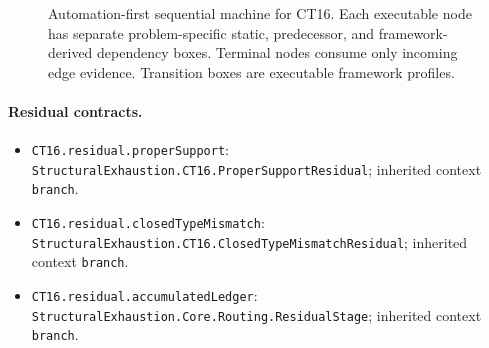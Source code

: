 \begin{landscape}
\begin{figure}[p]
\begin{adjustbox}{max totalsize={\linewidth}{0.72\textheight},center}
%
\end{adjustbox}
\caption{Automation-first sequential machine for CT16. Each executable node has separate problem-specific static, predecessor, and framework-derived dependency boxes. Terminal nodes consume only incoming edge evidence. Transition boxes are executable framework profiles.}
\label{fig:ct16-machine}
\end{figure}
\end{landscape}

\begingroup\small\sloppy
\paragraph{Residual contracts.}
\begin{itemize}
\item \texttt{CT16.\allowbreak{}residual.\allowbreak{}proper\allowbreak{}Support}: \texttt{Structural\allowbreak{}Exhaustion.\allowbreak{}CT16.\allowbreak{}Proper\allowbreak{}Support\allowbreak{}Residual}; inherited context \texttt{branch}.
\item \texttt{CT16.\allowbreak{}residual.\allowbreak{}closed\allowbreak{}Type\allowbreak{}Mismatch}: \texttt{Structural\allowbreak{}Exhaustion.\allowbreak{}CT16.\allowbreak{}Closed\allowbreak{}Type\allowbreak{}Mismatch\allowbreak{}Residual}; inherited context \texttt{branch}.
\item \texttt{CT16.\allowbreak{}residual.\allowbreak{}accumulated\allowbreak{}Ledger}: \texttt{Structural\allowbreak{}Exhaustion.\allowbreak{}Core.\allowbreak{}Routing.\allowbreak{}Residual\allowbreak{}Stage}; inherited context \texttt{branch}.
\end{itemize}
\endgroup
